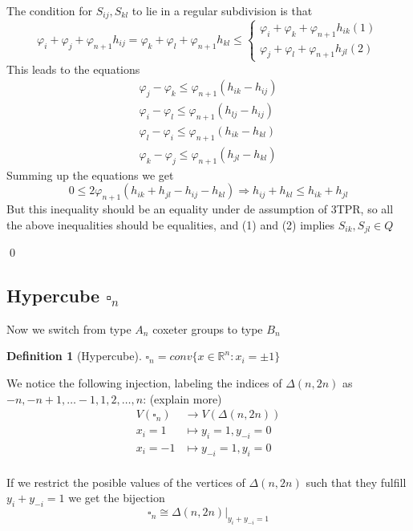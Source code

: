 \documentclass{myclass}
\newtheorem*{definition}{Definition}
\begin{document}
The condition for $S_{ij}, S_{kl}$ to lie in a regular subdivision is that
\[
\varphi _i + \varphi _j + \varphi _{n+1} h_{ij} = 
\varphi _k + \varphi _l + \varphi _{n+1} h_{kl} \le 
\begin{cases}
  \varphi _i + \varphi _k + \varphi _{n+1}h_{ik} (1)\\
  \varphi _j + \varphi _l + \varphi _{n+1}h_{jl} (2)
\end{cases}
\] 
This leads to the equations
\begin{align*}
 \varphi _j - \varphi _k \le \varphi _{n+1}(h_{ik}-h_{ij})  \\
 \varphi _i - \varphi _l \le \varphi _{n+1}(h_{lj}-h_{ij})  \\
 \varphi _l - \varphi _i \le \varphi _{n+1}(h_{ik}-h_{kl})  \\
 \varphi _k - \varphi _j \le \varphi _{n+1}(h_{jl}-h_{kl})
\end{align*}
Summing up the equations we get
\[
0\le 2\varphi_{n+1}(h_{ik}+ h_{jl} - h_{ij}-h_{kl}) \Rightarrow h_{ij} + h_{kl} \le h_{ik} + h_{jl}
\] 
But this inequality should be an equality under de assumption of 3TPR, so all the above inequalities should be equalities, and (1) and (2) implies $S_{ik}, S_{jl}\in Q$

\qed

\subsection{Hypercube $\square_n$}

Now we switch from type $A_n$ coxeter groups to type $B_n$

\begin{definition}[Hypercube]
$\square_n  = conv\{x\in \mathbb{R}^n: x_i = \pm 1\}$
\end{definition}

We notice the following injection, labeling the indices of $\Delta(n, 2n)$ as  $-n, -n+1,  \ldots -1, 1, 2, \ldots ,n$: (explain more)
\begin{align*}
  V(\square_n) &\to V(\Delta(n, 2n)) \\
  x_i = 1 & \mapsto y_i=1, y_{-i}=0 \\
  x_i = -1 & \mapsto y_{-i}=1, y_{i}=0 \\
\end{align*}

If we restrict the posible values of the vertices of $\Delta(n, 2n)$ such that they fulfill $y_i + y_{-i} = 1$ we get the bijection
\[
\square_n \cong \Delta(n, 2n) |_{y_i+y_{-i}=1}
\] 
\end{document}
